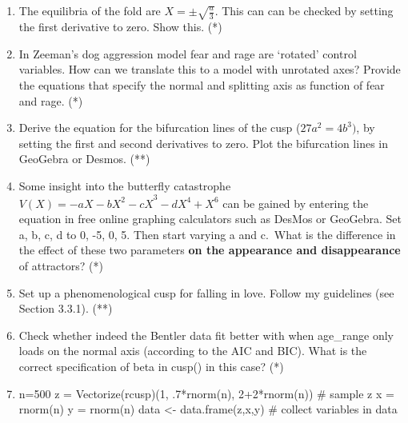 \documentclass[
  letterpaper,
]{scrbook}
\newenvironment{Shaded}{\begin{snugshade}}{\end{snugshade}}
\newcommand{\CommentTok}[1]{\textcolor[rgb]{0.37,0.37,0.37}{#1}}
\newcommand{\DecValTok}[1]{\textcolor[rgb]{0.68,0.00,0.00}{#1}}
\newcommand{\FunctionTok}[1]{\textcolor[rgb]{0.28,0.35,0.67}{#1}}
\newcommand{\NormalTok}[1]{\textcolor[rgb]{0.00,0.23,0.31}{#1}}
\newcommand{\OtherTok}[1]{\textcolor[rgb]{0.00,0.23,0.31}{#1}}
\newcommand{\SpecialCharTok}[1]{\textcolor[rgb]{0.37,0.37,0.37}{#1}}
\begin{document}
\begin{enumerate}
\def\labelenumi{\arabic{enumi})}
\item
  The equilibria of the fold are \(X = \pm \sqrt{\frac{a}{3}}\). This
  can can be checked by setting the first derivative to zero. Show this.
  (*)
\item
  In Zeeman's dog aggression model fear and rage are `rotated' control
  variables. How can we translate this to a model with unrotated axes?
  Provide the equations that specify the normal and splitting axis as
  function of fear and rage. (*)
\item
  Derive the equation for the bifurcation lines of the cusp
  (\(27a^{2} = 4b^{3})\), by setting the first and second derivatives to
  zero. Plot the bifurcation lines in GeoGebra or Desmos. (**)
\item
  Some insight into the butterfly catastrophe
  \(V(X) = {- aX - bX^{2} - cX}^{3} - dX^{4} + X^{6}\) can be gained by
  entering the equation in free online graphing calculators such as
  DesMos or GeoGebra. Set a, b, c, d to 0, -5, 0, 5. Then start varying
  a and c.~What is the difference in the effect of these two parameters
  \textbf{on the appearance and disappearance} of attractors? (*)
\item
  Set up a phenomenological cusp for falling in love. Follow my
  guidelines (see Section 3.3.1). (**)
\item
  Check whether indeed the Bentler data fit better with when age\_range
  only loads on the normal axis (according to the AIC and BIC). What is
  the correct specification of beta in cusp() in this case? (*)
\item
\begin{Shaded}
\begin{Highlighting}[]
\NormalTok{n}\OtherTok{=}\DecValTok{500}
\NormalTok{z }\OtherTok{=} \FunctionTok{Vectorize}\NormalTok{(rcusp)(}\DecValTok{1}\NormalTok{, .}\DecValTok{7}\SpecialCharTok{*}\FunctionTok{rnorm}\NormalTok{(n), }\DecValTok{2}\SpecialCharTok{+}\DecValTok{2}\SpecialCharTok{*}\FunctionTok{rnorm}\NormalTok{(n)) }\CommentTok{\# sample z }
\NormalTok{x }\OtherTok{=} \FunctionTok{rnorm}\NormalTok{(n) }
\NormalTok{y }\OtherTok{=} \FunctionTok{rnorm}\NormalTok{(n) }
\NormalTok{data }\OtherTok{\textless{}{-}} \FunctionTok{data.frame}\NormalTok{(z,x,y) }\CommentTok{\# collect variables in data}
\end{Highlighting}
\end{Shaded}
\end{enumerate}
\end{document}
